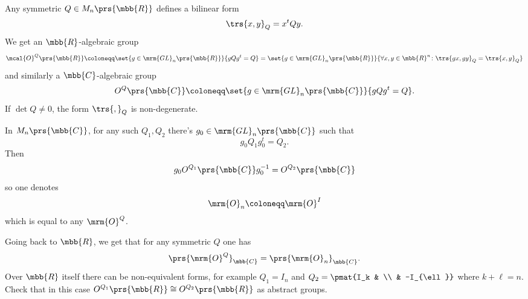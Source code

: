 \documentclass[10pt,a4paper,twoside,openany,hidelinks]{book}
\begin{document}
\begin{example}
Any symmetric $Q \in M_n\prs{\mbb{R}}$ defines a bilinear form
\[\trs{x,y}_Q = x^t Q y \text{.}\]
We get an $\mbb{R}$-algebraic group
\[\mcal{O}^{Q}\prs{\mbb{R}} \coloneqq \set{g \in \mrm{GL}_n\prs{\mbb{R}}}{gQg^t = Q} = \set{g \in \mrm{GL}_n\prs{\mbb{R}}}{\forall x,y \in \mbb{R}^n \colon \trs{gx,gy}_Q = \trs{x,y}_Q}\]
and similarly a $\mbb{C}$-algebraic group
\[O^Q\prs{\mbb{C}} \coloneqq \set{g \in \mrm{GL}_n\prs{\mbb{C}}}{gQg^t = Q} \text{.}\]
If $\det Q \neq 0$, the form $\trs{,}_Q$ is non-degenerate.

In $M_n\prs{\mbb{C}}$, for any such $Q_1, Q_2$ there's $g_0 \in \mrm{GL}_n\prs{\mbb{C}}$ such that
\[g_0 Q_1 g_0^t = Q_2 \text{.}\]
Then
\[g_0 O^{Q_1}\prs{\mbb{C}} g_0^{-1} = O^{Q_2}\prs{\mbb{C}}\]
so one denotes
\[\mrm{O}_n \coloneqq \mrm{O}^I\]
which is equal to any $\mrm{O}^Q$.

Going back to $\mbb{R}$, we get that for any symmetric $Q$ one has
\[\prs{\mrm{O}^Q}_{\mbb{C}} = \prs{\mrm{O}_n}_{\mbb{C}} \text{.}\]
Over $\mbb{R}$ itself there can be non-equivalent forms, for example $Q_1 = I_n$ and $Q_2 = \pmat{I_k & \\ & -I_{\ell}}$ where $k+\ell = n$. Check that in this case $O^{Q_1}\prs{\mbb{R}} \cong O^{Q_2}\prs{\mbb{R}}$ as abstract groups.
\end{example}
\end{document}
